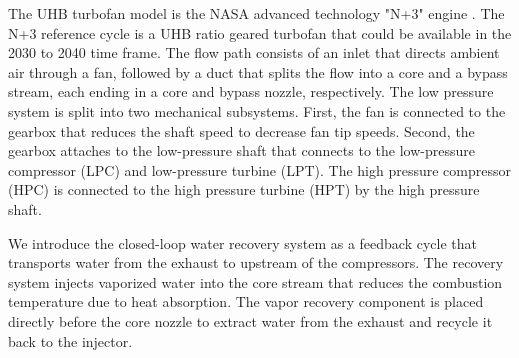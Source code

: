 \documentclass[conf]{new-aiaa}
\begin{document}
The UHB turbofan model is the NASA advanced technology "N+3" engine \cite{Jones2017a}.
The N+3 reference cycle is a UHB ratio geared turbofan that could be available in the 2030 to 2040 time frame.
The flow path consists of an inlet that directs ambient air through a fan, followed by a duct that splits the flow into a core and a bypass stream, each ending in a core and bypass nozzle, respectively.
The low pressure system is split into two mechanical subsystems.
First, the fan is connected to the gearbox that reduces the shaft speed to decrease fan tip speeds.
Second, the gearbox attaches to the low-pressure shaft that connects to the low-pressure compressor (LPC) and low-pressure turbine (LPT).
The high pressure compressor (HPC) is connected to the high pressure turbine (HPT) by the high pressure shaft.

We introduce the closed-loop water recovery system as a feedback cycle that transports water from the exhaust to upstream of the compressors.
The recovery system injects vaporized water into the core stream that reduces the combustion temperature due to heat absorption.
The vapor recovery component is placed directly before the core nozzle to extract water from the exhaust and recycle it back to the injector.
\end{document}
